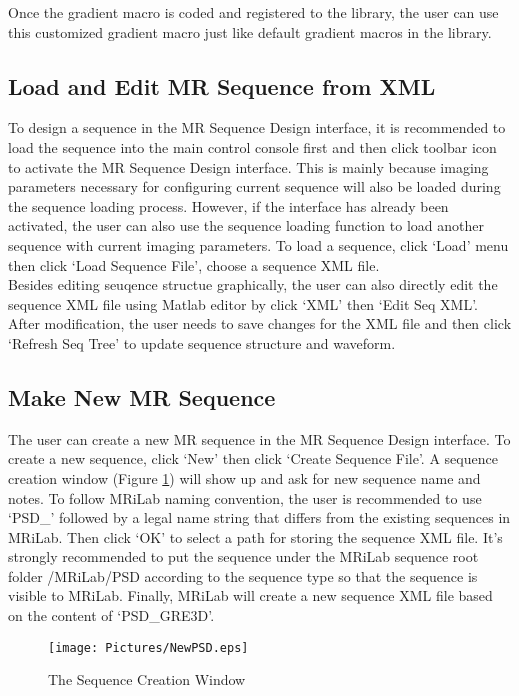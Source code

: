 \documentclass{book}%
\begin{document}
Once the gradient macro is coded and registered to the library, the user can use this customized gradient macro just like default gradient macros in the library.

\subsection{Load and Edit MR Sequence from XML}
To design a sequence in the MR Sequence Design interface, it is recommended to load the sequence into the main control console first and then click toolbar icon to activate the MR Sequence Design interface. This is mainly because imaging parameters necessary for configuring current sequence will also be loaded during the sequence loading process. However, if the interface has already been activated, the user can also use the sequence loading function to load another sequence with current imaging parameters. To load a sequence, click `Load' menu then click `Load Sequence File', choose a sequence XML file.\\

Besides editing seuqence structue graphically, the user can also directly edit the sequence XML file using Matlab editor by click `XML' then `Edit Seq XML'. After modification, the user needs to save changes for the XML file and then click `Refresh Seq Tree' to update sequence structure and waveform.

\subsection{Make New MR Sequence}
The user can create a new MR sequence in the MR Sequence Design interface. To create a new sequence, click `New' then click `Create Sequence File'. A sequence creation window (Figure \ref{fig:NewPSD}) will show up and ask for new sequence name and notes. To follow MRiLab naming convention, the user is recommended to use `PSD\_' followed by a legal name string that differs from the existing sequences in MRiLab. Then click `OK' to select a path for storing the sequence XML file. It's strongly recommended to put the sequence under the MRiLab sequence root folder /MRiLab/PSD according to the sequence type so that the sequence is visible to MRiLab. Finally, MRiLab will create a new sequence XML file based on the content of `PSD\_GRE3D'.

\begin{figure}[htbp]
	\centering
		\texttt{[image: Pictures/NewPSD.eps]}
	\caption{The Sequence Creation Window}
	\label{fig:NewPSD}
\end{figure}
\end{document}
